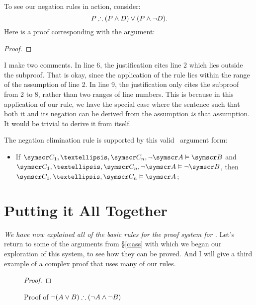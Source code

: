 To see our negation rules in action, consider:
	$$P \mathrel{\therefore} (P \wedge D) \vee (P \wedge \neg D).$$
Here is a proof corresponding with the argument:
	\begin{proof}
		\open
			\open
			\close
		\close
	\end{proof} I make two comments. In line 6, the justification cites line 2 which lies outside the subproof. That is okay, since  the application of the rule lies within the range of the assumption of line 2. In line 9, the justification only cites the subproof from 2 to 8, rather than two ranges of line numbers. This is because in this application of our rule, we have the special case where the sentence such that both it and its negation can be derived from the assumption \emph{is} that assumption. It would be trivial to derive it from itself.

The negation elimination rule is supported by this valid \TFL\ argument form: \begin{itemize}
	\item If $\meta{C}_{1},…,\meta{C}_{n},\enot\meta{A} \vDash \meta{B}$ and $\meta{C}_{1},…,\meta{C}_{n},\enot\meta{A} \vDash \enot\meta{B}$, then $\meta{C}_{1},…,\meta{C}_{n} \vDash \meta{A}$;
\end{itemize}

\section{Putting it All Together}\label{c:putting}

\emph{We have now explained all of the basic rules for the proof system for \TFL.} Let's return to some of the arguments from §\ref{c:ass} with which we began our exploration of this system, to see how they can be proved. And I will give a third example of a complex proof that uses many of our rules. 

\begin{figure}
 \begin{proof}
	\open
	\close
	\open
	\close
\end{proof} 	\caption{Proof of $\neg (A \vee B) \mathrel{\therefore} (\neg A \wedge \neg B)$\label{figa1}}
\end{figure}

